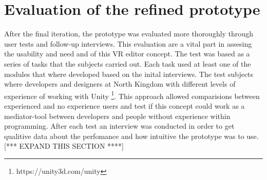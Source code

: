 \section{Evaluation of the refined prototype}
After the final iteration, the prototype was evaluated more thoroughly through user tests and follow-up interviews. This evaluation are a vital part in assesing the usability and need and of this VR editor concept. The test was based as a series of tasks that the subjects carried out. Each task used at least one of the modules that where developed based on the inital interviews. The test subjects where developers and designers at North Kingdom with different levels of experience of working with Unity \footnote{https://unity3d.com/unity}. This approach allowed comparisions between experienced and no experience users and test if this concept could work as a mediator-tool between developers and people without experience within programming. After each test an interview was conducted in order to get qualitive data about the perfomance and how intuitive the prototype was to use. [*** EXPAND THIS SECTION ****]
